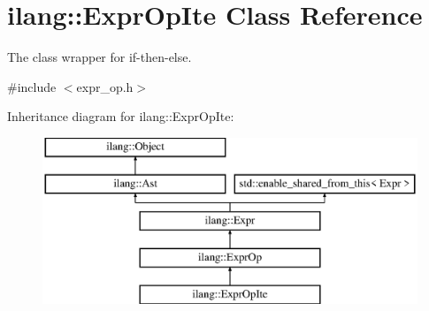 \hypertarget{classilang_1_1_expr_op_ite}{}\section{ilang\+:\+:Expr\+Op\+Ite Class Reference}
\label{classilang_1_1_expr_op_ite}


The class wrapper for if-\/then-\/else.  




{\ttfamily \#include $<$expr\+\_\+op.\+h$>$}

Inheritance diagram for ilang\+:\+:Expr\+Op\+Ite\+:\begin{figure}[H]
\begin{center}
\leavevmode
\includegraphics[height=5.000000cm]{classilang_1_1_expr_op_ite}
\end{center}
\end{figure}
